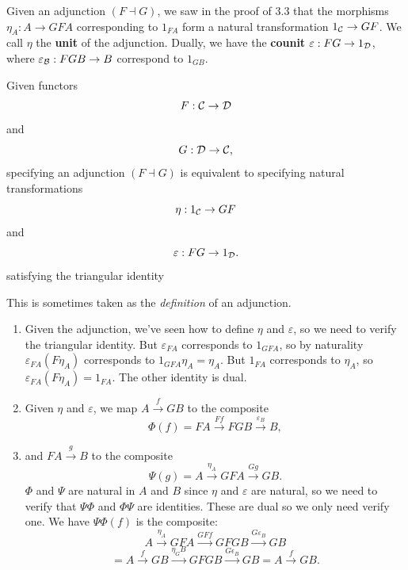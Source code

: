 \documentclass{article}
\begin{document}
\newlec Given an adjunction $(F \dashv G)$, we saw in the proof of 3.3 that the morphisms $\eta_{A} : A \to GFA$ corresponding to $1_{FA}$ form a natural transformation $1_{\mathcal{C}} \to GF$. We call $\eta$ the \textbf{unit} of the adjunction. Dually, we have the \textbf{counit} $\varepsilon: FG \to 1_{\mathcal{D}}$, where $\varepsilon_{\mathcal{B}} : FGB \to B$ correspond to $1_{GB}$.
\begin{fancythm}{}
    Given functors \[ F: \mathcal{C} \to \mathcal{D}\] and \[G : \mathcal{D} \to \mathcal{C},\] specifying an adjunction $(F \dashv G)$ is equivalent to specifying natural transformations \[ \eta : 1_{\mathcal{C}} \to GF\] and \[ \varepsilon: FG \to 1_{\mathcal{D}}.\] satisfying the triangular identity \begin{center}
    \end{center}
    \begin{center}
    \end{center}
    This is sometimes taken as the \textit{definition} of an adjunction.
\end{fancythm}
\proof \hspace{0.1cm}
\begin{enumerate}
    \item[$\Rightarrow$] Given the adjunction, we've seen how to define $\eta$ and $\varepsilon$, so we need to verify the triangular identity. But $\varepsilon_{FA}$ corresponds to $1_{GFA}$, so by naturality $\varepsilon_{FA}(F\eta_{A})$ corresponds to $1_{GFA} \eta_{A} = \eta_{A}$. But $1_{FA}$ corresponds to $\eta_{A}$, so $\varepsilon_{FA}(F \eta_{A}) = 1_{FA}$. The other identity is dual.
    \item[$\Leftarrow$] Given $\eta$ and $\varepsilon$, we map $A \xrightarrow{f} GB$ to the composite \[ \Phi(f)=FA \xrightarrow{Ff} FGB \xrightarrow{\varepsilon_{B}} B,\] 
    \item[] and $FA \xrightarrow{g} B$ to the composite \[ \Psi(g) = A \xrightarrow{\eta_{A}} GFA \xrightarrow{Gg} GB.\] $\Phi$ and $\Psi$ are natural in $A$ and $B$ since $\eta$ and $\varepsilon$ are natural, so we need to verify that $\Psi \Phi$ and $\Phi \Psi$ are identities. These are dual so we only need verify one. We have $\Psi \Phi(f)$ is the composite: \[ A \xrightarrow{\eta_{A}} GFA \xrightarrow{GFf} GFGB \xrightarrow{G \varepsilon_B} GB\]
    \[ = A \xrightarrow{f} GB \xrightarrow{\eta_GB} GFGB \xrightarrow{G \epsilon_B} GB = A \xrightarrow{f} GB.\]
\end{enumerate}
\end{document}
